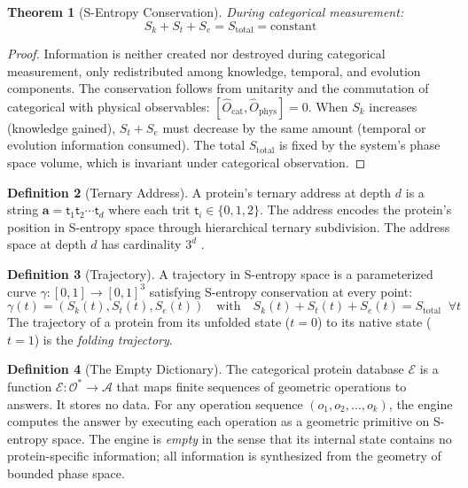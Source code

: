 \documentclass[11pt,twocolumn,a4paper]{article}
\newtheorem{theorem}{Theorem}[section]
\theoremstyle{definition}
\newtheorem{definition}[theorem]{Definition}
\theoremstyle{remark}
\newcommand{\Sk}{S_k}
\newcommand{\St}{S_t}
\newcommand{\Se}{S_e}
\newcommand{\opspace}{\mathcal{O}}
\newcommand{\addr}{\mathbf{a}}
\newcommand{\trit}{\mathsf{t}}
\newcommand{\engine}{\mathcal{E}}
\begin{document}
\begin{theorem}[S-Entropy Conservation]
\label{thm:conservation}
During categorical measurement:
\begin{equation}
\Sk + \St + \Se = S_{\mathrm{total}} = \mathrm{constant}
\end{equation}
\end{theorem}

\begin{proof}
Information is neither created nor destroyed during categorical measurement, only redistributed among knowledge, temporal, and evolution components. The conservation follows from unitarity and the commutation of categorical with physical observables: $[\hat{O}_{\mathrm{cat}}, \hat{O}_{\mathrm{phys}}] = 0$. When $\Sk$ increases (knowledge gained), $\St + \Se$ must decrease by the same amount (temporal or evolution information consumed). The total $S_{\mathrm{total}}$ is fixed by the system's phase space volume, which is invariant under categorical observation.
\end{proof}

\begin{definition}[Ternary Address]
\label{def:ternary_address}
A protein's ternary address at depth $d$ is a string $\addr = \trit_1 \trit_2 \cdots \trit_d$ where each trit $\trit_i \in \{0, 1, 2\}$. The address encodes the protein's position in S-entropy space through hierarchical ternary subdivision. The address space at depth $d$ has cardinality $3^d$ \citep{sachikonye2025d}.
\end{definition}

\begin{definition}[Trajectory]
\label{def:trajectory}
A trajectory in S-entropy space is a parameterized curve $\gamma: [0,1] \to [0,1]^3$ satisfying S-entropy conservation at every point:
\begin{equation}
\gamma(t) = (\Sk(t), \St(t), \Se(t)) \quad \text{with} \quad \Sk(t) + \St(t) + \Se(t) = S_{\mathrm{total}} \;\; \forall t
\end{equation}
The trajectory of a protein from its unfolded state ($t=0$) to its native state ($t=1$) is the \emph{folding trajectory}.
\end{definition}

\begin{definition}[The Empty Dictionary]
\label{def:empty_dictionary}
The categorical protein database $\engine$ is a function $\engine: \opspace^* \to \mathcal{A}$ that maps finite sequences of geometric operations to answers. It stores no data. For any operation sequence $(o_1, o_2, \ldots, o_k)$, the engine computes the answer by executing each operation as a geometric primitive on S-entropy space. The engine is \emph{empty} in the sense that its internal state contains no protein-specific information; all information is synthesized from the geometry of bounded phase space.
\end{definition}
\end{document}
